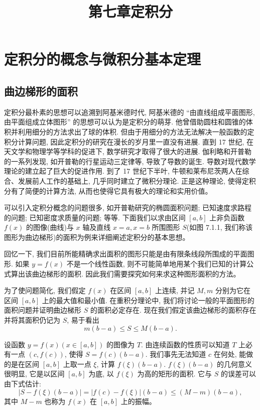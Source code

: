 \documentclass[UTF8, 12pt, fontset=fandol, oneside]{ctexart}
\title{第七章\quad 定积分}
\author{}
\date{}
\begin{document}
\maketitle

\section{定积分的概念与微积分基本定理}

\subsection{曲边梯形的面积}

定积分最朴素的思想可以追溯到阿基米德时代, 阿基米德的 ``由直线组成平面图形, 由平面组成立体图形'' 的思想可以认为是定积分的萌芽. 他曾借助圆柱和圆锥的体积并利用细分的方法求出了球的体积. 但由于用细分的方法无法解决一般函数的定积分计算问题, 因此定积分的研究在漫长的岁月里一直没有进展. 直到 17 世纪, 在天文学和物理学等学科的促进下, 数学研究才取得了很大的进展. 伽利略和开普勒的一系列发现, 如开普勒的行星运动三定律等, 导致了导数的诞生. 导数对现代数学理论的建立起了巨大的促进作用. 到了 17 世纪下半叶, 牛顿和莱布尼茨两人在综合、发展前人工作的基础上, 几乎同时建立了微积分理论. 正是这种理论, 使得定积分有了简便的计算方法, 从而也使得它具有极大的理论和实用价值。

可以引入定积分概念的问题很多, 如开普勒研究的椭圆面积问题; 已知速度求路程的问题; 已知密度求质量的问题; 等等. 下面我们以求由区间 $[a,b]$ 上非负函数 $f(x)$ 的图像(曲线)与 $x$ 轴及直线 $x=a,x=b$ 所围图形 $S$(如图 7.1.1, 我们称该图形为曲边梯形)的面积为例来详细阐述定积分的基本思想。

回忆一下, 我们目前所能精确求出面积的图形只能是由有限条线段所围成的平面图形. 如果 $y=f(x)$ 不是一个线性函数, 则不可能简单地用某个我们已知的计算公式算出该曲边梯形的面积. 因此我们需要探究如何来求这种图形面积的方法。

为了使问题简化, 我们假定 $f(x)$ 在区间 $[a,b]$ 上连续, 并记 $M,m$ 分别为它在区间 $[a,b]$ 上的最大值和最小值. 在重积分理论中, 我们将讨论一般的平面图形的面积问题并证明曲边梯形 $S$ 的面积必定存在. 现在我们假定该曲边梯形的面积存在并将其面积仍记为 $S$, 易于看出
\[
  m(b-a)\leq S\leq M(b-a).
\]

设函数 $y=f(x)(x\in[a,b])$ 的图像为 $T$. 由连续函数的性质可以知道 $T$ 上必有一点 $(c,f(c))$, 使得 $S=f(c)(b-a)$. 我们事先无法知道 $c$ 在何处, 能做的是在区间 $[a,b]$ 上取一点 $\xi$, 计算 $f(\xi)(b-a)$. $f(\xi)(b-a)$ 的几何意义很明显, 它是以区间 $[a,b]$ 为底, 以 $f(\xi)$ 为高的矩形的面积. 它与 $S$ 的误差可以由下式估计:
\[
  |S-f(\xi)(b-a)|=|f(c)-f(\xi)|(b-a)\leq (M-m)(b-a),
\]
其中 $M-m$ 也称为 $f(x)$ 在 $[a,b]$ 上的振幅。
\end{document}
